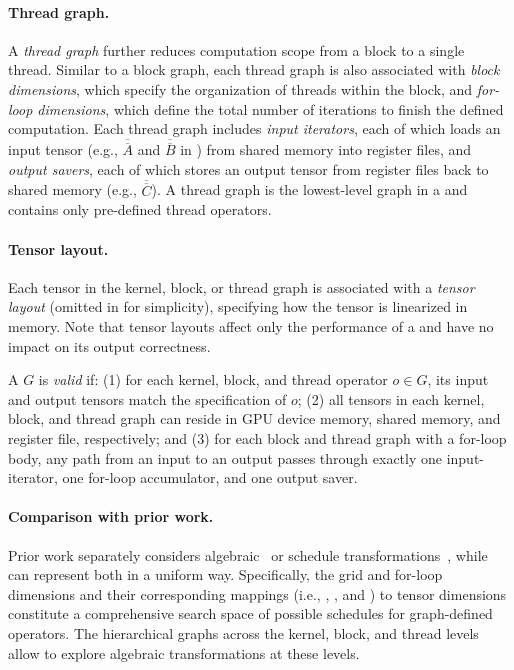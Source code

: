 \paragraph{Thread graph.} A {\em thread graph} further reduces computation scope from a block to a single thread. Similar to a block graph, each thread graph is also associated with {\em block dimensions}, which specify the organization of threads within the block, and {\em for-loop dimensions}, which define the total number of iterations to finish the defined computation. Each thread graph includes {\em input iterators}, each of which loads an input tensor (e.g., $\overline{\overline{A}}$ and $\overline{\overline{B}}$ in ) from shared memory into register files, and {\em output savers}, each of which stores an output tensor from register files back to shared memory (e.g., $\overline{\overline{C}}$).
%
A thread graph is the lowest-level graph in a \graph and contains only pre-defined thread operators.

\paragraph{Tensor layout.} Each tensor in the kernel, block, or thread graph is associated with a {\em tensor layout} (omitted in  for simplicity), specifying how the tensor is linearized in memory.
%
Note that tensor layouts affect only the performance of a \graph and have no impact on its output correctness.

\begin{definition}
A \graph $G$ is \emph{valid} if: (1) for each kernel, block, and thread operator $o\in G$, its input and output tensors match the specification of $o$; (2) all tensors in each kernel, block, and thread graph can reside in GPU device memory, shared memory, and register file, respectively; and (3) for each block and thread graph with a for-loop body, any path from an input to an output passes through exactly one input-iterator, one for-loop accumulator, and one output saver.
\end{definition}

\paragraph{Comparison with prior work.}
Prior work separately considers algebraic~\cite{TASO, wang2021pet} or schedule transformations~\cite{halide, tvm, autohalide}, while \graphs can represent both in a uniform way.
Specifically, the grid and for-loop dimensions and their corresponding mappings (i.e., \imap, \omap, and \fmap) to tensor dimensions constitute a comprehensive search space of possible schedules for graph-defined operators. The hierarchical graphs across the kernel, block, and thread levels allow \sys to explore algebraic transformations at these levels.

